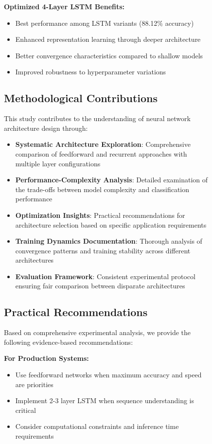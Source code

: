 \documentclass[a4paper, journal]{IEEEtran}
\begin{document}
\begin{figure}[!t]
\textbf{Optimized 4-Layer LSTM Benefits:}
\begin{itemize}
    \item Best performance among LSTM variants (88.12\% accuracy)
    \item Enhanced representation learning through deeper architecture
    \item Better convergence characteristics compared to shallow models
    \item Improved robustness to hyperparameter variations
\end{itemize}

\subsection{Methodological Contributions}

This study contributes to the understanding of neural network architecture design through:

\begin{itemize}
    \item \textbf{Systematic Architecture Exploration}: Comprehensive comparison of feedforward and recurrent approaches with multiple layer configurations
    \item \textbf{Performance-Complexity Analysis}: Detailed examination of the trade-offs between model complexity and classification performance
    \item \textbf{Optimization Insights}: Practical recommendations for architecture selection based on specific application requirements
    \item \textbf{Training Dynamics Documentation}: Thorough analysis of convergence patterns and training stability across different architectures
    \item \textbf{Evaluation Framework}: Consistent experimental protocol ensuring fair comparison between disparate architectures
\end{itemize}

\subsection{Practical Recommendations}

Based on comprehensive experimental analysis, we provide the following evidence-based recommendations:

\textbf{For Production Systems:}
\begin{itemize}
    \item Use feedforward networks when maximum accuracy and speed are priorities
    \item Implement 2-3 layer LSTM when sequence understanding is critical
    \item Consider computational constraints and inference time requirements
\end{itemize}


\end{figure}
\end{document}
